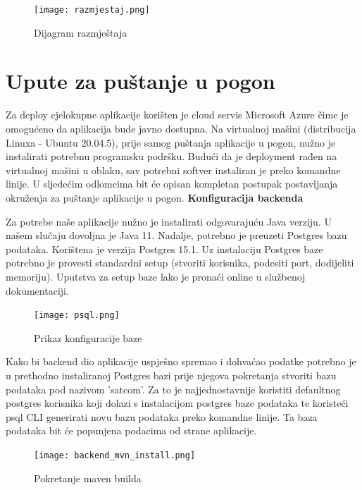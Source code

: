 			 \begin{figure}[H]
				\texttt{[image: razmjestaj.png]}
				\caption{Dijagram razmještaja}
				\label{fig:Dijagram_razmjestaja}
			\end{figure}
		\newpage
		

			\eject 
		
		\section{Upute za puštanje u pogon}

    Za deploy cjelokupne aplikacije korišten je cloud servis Microsoft Azure čime je omogućeno da aplikacija bude javno dostupna. Na virtualnoj mašini (distribucija Linuxa - Ubuntu 20.04.5), prije samog puštanja aplikacije u pogon, nužno je instalirati potrebnu programsku podršku. Budući da je deployment rađen na virtualnoj mašini u oblaku, sav potrebni softver instaliran je preko komandne linije. U sljedećim odlomcima bit će opisan kompletan postupak postavljanja okruženja za puštanje aplikacije u pogon.
    \newline
    \newline
    \textbf{Konfiguracija backenda}
    
    Za potrebe naše aplikacije nužno je instalirati odgovarajuću Java verziju. U našem slučaju dovoljna je Java 11. Nadalje, potrebno je preuzeti Postgres bazu podataka. Korištena je verzija Postgres 15.1. Uz instalaciju Postgres baze potrebno je provesti standardni setup (stvoriti korisnika, podesiti port, dodijeliti memoriju). Uputstva za setup baze lako je pronaći online u službenoj dokumentaciji.
    
    \begin{figure}[H]
			\texttt{[image: psql.png]}
			\caption{Prikaz konfiguracije baze}
			\label{fig:baza}
		\end{figure}

		Kako bi backend dio aplikacije uspješno spremao i dohvaćao podatke potrebno je u prethodno instaliranoj Postgres bazi prije njegova pokretanja stvoriti bazu podataka pod nazivom 'satcom'. Za to je najjednostavnije koristiti defaultnog postgres korisnika koji dolazi s instalacijom postgres baze podataka te koristeći psql CLI generirati novu bazu podataka preko komandne linije. Ta baza podataka bit će popunjena podacima od strane aplikacije.
    \newline
      \begin{figure}[H]
			\texttt{[image: backend\_mvn\_install.png]}
			\caption{Pokretanje maven builda}
			\label{fig:build}
		\end{figure}

